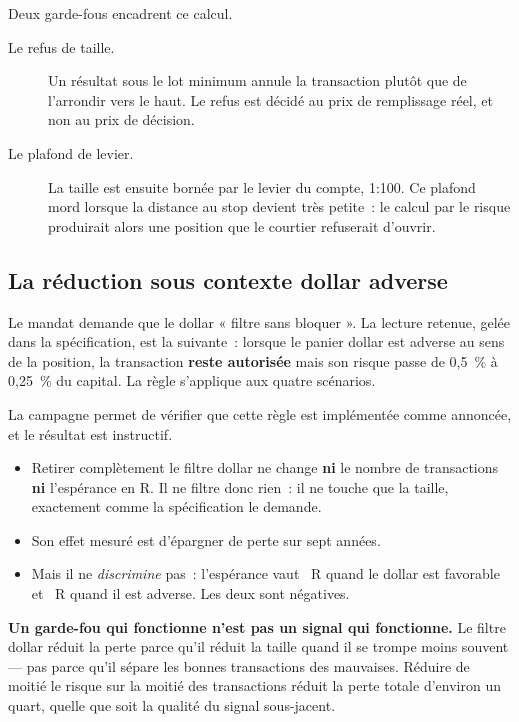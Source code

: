 Deux garde-fous encadrent ce calcul.

\begin{description}
  \item[Le refus de taille.] Un résultat sous le lot minimum annule la
  transaction plutôt que de l'arrondir vers le haut. Le refus est décidé au
  prix de remplissage réel, et non au prix de décision.
  \item[Le plafond de levier.] La taille est ensuite bornée par le levier du
  compte, 1:100. Ce plafond mord lorsque la distance au stop devient très
  petite~: le calcul par le risque produirait alors une position que le
  courtier refuserait d'ouvrir.
\end{description}

\subsection{La réduction sous contexte dollar adverse}

Le mandat demande que le dollar « filtre sans bloquer ». La lecture retenue,
gelée dans la spécification, est la suivante~: lorsque le panier dollar est
adverse au sens de la position, la transaction \textbf{reste autorisée} mais
son risque passe de 0,5~\% à 0,25~\% du capital. La règle s'applique aux
quatre scénarios.

La campagne permet de vérifier que cette règle est implémentée comme annoncée,
et le résultat est instructif.

\begin{itemize}
  \item Retirer complètement le filtre dollar ne change \textbf{ni} le nombre
  de transactions \textbf{ni} l'espérance en R. Il ne filtre donc rien~: il ne
  touche que la taille, exactement comme la spécification le demande.
  \item Son effet mesuré est d'épargner \metric{\XTenDxySavings} de perte sur
  sept années.
  \item Mais il ne \emph{discrimine} pas~: l'espérance vaut
  \XTenDxyFavourableR{}~R quand le dollar est favorable et
  \XTenDxyAdverseR{}~R quand il est adverse. Les deux sont négatives.
\end{itemize}

\begin{warningbox}
\textbf{Un garde-fou qui fonctionne n'est pas un signal qui fonctionne.} Le
filtre dollar réduit la perte parce qu'il réduit la taille quand il se trompe
moins souvent --- pas parce qu'il sépare les bonnes transactions des
mauvaises. Réduire de moitié le risque sur la moitié des transactions réduit
la perte totale d'environ un quart, quelle que soit la qualité du signal
sous-jacent.
\end{warningbox}

